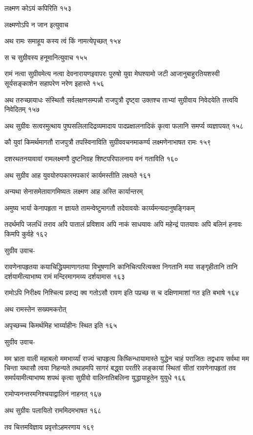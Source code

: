 लक्ष्मण कोऽयं कपिरिति १५३

लक्ष्मणोऽपि न जान इत्युवाच

अथ रामः समाहूय कस्य त्वं किं नामत्येपृच्छत् १५४

स च सुग्रीवस्य हनूमानित्युवाच १५५

रामं नत्वा सुग्रीवमेत्य नत्वा देवनारायणइवापरः पुरुषो युवा मेघश्यामो जटी
आजानुबाहुरतियशस्वी सूर्यसङ्काशेन सहापरेण नरेण इहास्ते १५६

अथ तरुच्छायाधः संस्थितौ सर्वलक्षणसम्पन्नौ राजपुत्रौ दृष्ट्वा उक्तश्च ताभ्यां सुग्रीवाय
निवेदयेति तत्त्वयि निवेदितम् १५७

अथ सुग्रीवः सत्वरमुत्थाय पुष्पसलिलादिद्रव्यमादाय पादप्रक्षालनादिकं कृत्वा फलानि समर्प्य
व्यज्ञापयत् १५८

कौ युवां किमर्थमागतौ राजपुत्रौ तपस्विनाविति सुग्रीववचनमाकर्ण्य लक्ष्मणेनाभाषत रामः
 १५९

दशरथतनयावावां रामलक्ष्मणौ दुष्टनिग्रह शिष्टपरिपालनाय वनं गताविति १६०

अथ सुग्रीव आह युवयोरुपकारमपकारं कार्यमस्तीति लक्ष्यते १६१

अन्यथा सेनासमेतावागमिष्यतः लक्ष्मण आह अस्ति कार्यान्तरम्

अमुष्य भार्या केनापहृता न ज्ञायते तामन्वेष्टुमागतौ तदेवावयोः कार्य्यमन्यदानुषङ्गिकम्

तदर्थमपि जलधिं तराव अपि पातालं प्रविशाव अपि नाकं साधयावः अपि महेन्द्रं पातयावः अपि
बलिनं हनावः किमपि कुर्वहे १६२

सुग्रीव उवाच-

रावणेनापहृतया कयाचिद्ध्रियमाणागतया विभूषणानि कानिचित्परित्यक्ता निगतानि मया
सङ्गृहीतानि तानि दर्शयामीत्याभाष्य रामं मन्दिरमागमय्य दर्शयामास १६३

रामोऽपि निरीक्ष्य निश्चित्य प्ररुद्य क्व गतोऽसौ रावण इति पप्रच्छ स च दक्षिणामाशां गत
इति बभाषे १६४

अथ रामस्तेन सख्यमकरोत्

अपृच्छच्च किमर्थमिह भार्य्याहीनः स्थित इति १६५

सुग्रीव उवाच-

मम भ्राता वाली महाबलो ममभार्य्यां राज्यं चापहृत्य किष्किन्धायामास्ते युद्धेन चाहं
पराजितः तद्वधाय सर्वथा मम चिन्ता यथासौ त्वया निहन्यते तथाहमपि सागरं बद्ध्वा परतीरे
लङ्कायां स्थितां सीतां रावणेनापहृतां तव समर्पयामीत्याभाष्य शपथं कृत्वा सुग्रीवो
वालिनातिबलिना युद्धायाहूतेन युयुधे १६६

रामोप्यनन्तरमनिश्चयाद्वालिनं नाहनत् १६७

अथ सुग्रीवः पलायितो राममिदमभाषत १६८

तव चित्तमविज्ञाय प्रवृत्तोऽहमरणाय १६९

